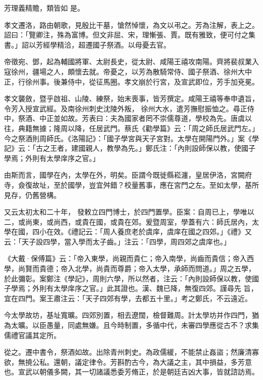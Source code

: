 \begin{pinyinscope}
 芳理義精贍，類皆如
 是。



 孝文遷洛，路由朝歌，見殷比干墓，愴然悼懷，為文以弔之。芳為注解，表上之。詔曰：「覽卿注，殊為富博。但文非屈、宋，理慚張、賈。既有雅致，便可付之集書。」詔以芳經學精洽，超遷國子祭酒。以母憂去官。



 帝徵宛、鄧，起為輔國將軍、太尉長史，從太尉、咸陽王禧攻南陽。齊將裴叔業入寇徐州，疆場之人，頗懷去就。帝憂之，以芳為散騎常侍、國子祭酒、徐州大中正，行徐州事。後兼侍中，從征馬圈。孝文崩於行宮，及宣武即位，芳手加兗冕。



 孝文襲斂，暨乎啟祖、山陵、練祭，始末喪事，皆芳撰定。咸陽王禧等奉申遺旨，令芳入授宣武經。及南徐州刺史沈陵外叛，
 徐州大水，遣芳撫慰振恤之。尋正侍中，祭酒、中正並如故。芳表曰：夫為國家者罔不崇儒尊道，學校為先。唐虞以往，典籍無據；隆周以降，任居武門。蔡氏《勸學篇》云：「周之師氏居武門左。」今之祭酒則周師氏。《洛陽記》：「國子學宮與天子宮對。太學在開陽門外。」案《學記》云：「古之王者，建國親人，教學為先。」鄭氏注：「內則設師保以教，使國子學焉；外則有太學庠序之官。」



 由斯而言，國學在內，太學在外，明矣。臣謂今既徙縣崧瀍，皇居伊洛，宮闕府寺，僉復故址，至於國學，豈宜舛錯？校量舊事，應在宮門之左。至如太學，基所見存，仍舊營構。



 又云太初太和二十年，
 發敕立四門博士，於四門置學。臣案：自周已上，學唯以二，或尚東，或尚西，或貴在國，或貴在郊。爰暨周室，學蓋有六：師氏居內，太學在國，四小在效。《禮記云：「周人養庶老於虞庠，虞庠在國之四郊。」《禮》又云：「天子設四學，當入學而太子齒。」注云：「四學，周四郊之虞庠也。」



 《大戴·保傅篇》云：「帝入東學，尚親而貴仁；帝入南學，尚齒而貴信；帝入西學，尚賢而貴德；帝入北學，尚貴而尊爵；帝入太學，承師而問道。」周之五學，於此彌彰。案鄭注《學記》，周則六學，所以然者，注云：「內則設師保以教，使國子學焉；外則有太學庠序之官。」此其證也。漢、魏已降，無復四郊。謹尋先
 旨，宜在四門。案王肅注云：「天子四郊有學，去都五十里。」考之鄭氏，不云遠近。



 今太學故坊，基址寬曠。四郊別置，相去遼闊，檢督難周。計太學坊并作四門，猶為太曠。以臣愚量，同處無嫌。且今時制置，多循中代，未審四學應從古不？求集儒禮官議其定所。



 從之。遷中書令，祭酒如故。出除青州刺史。為政儒緩，不能禁止姦盜；然廉清寡欲，無撓公私。還朝，議定律令。芳斟酌古今，為大議之主，其中損益，多芳意也。宣武以朝儀多闕，其一切諸議悉委芳脩正，於是朝廷吉凶大事，皆就諮訪焉。




\end{pinyinscope}
